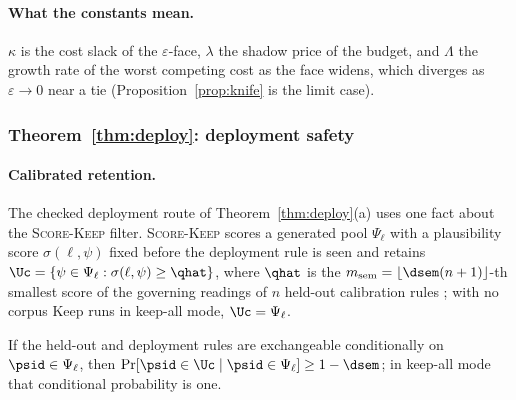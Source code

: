 \paragraph{What the constants mean.} $\kappa$ is the cost slack of the $\varepsilon$-face, $\lambda$
the shadow price of the budget, and $\Lambda$ the growth rate of the worst competing cost as the
face widens, which diverges as $\varepsilon\to0$ near a tie (Proposition~\ref{prop:knife} is the
limit case).

\subsubsection*{Theorem~\ref{thm:deploy}: deployment safety}
\label{app:proof-coverage}\label{app:proof-deploy}

\paragraph{Calibrated retention.} The checked deployment route of Theorem~\ref{thm:deploy}(a) uses one fact about the
\textsc{Score-Keep} filter. \textsc{Score-Keep} scores
a generated pool $\Psi_\ell$ with a plausibility score $\sigma(\ell,\psi)$ fixed before
the deployment rule is seen and retains
$\Uc=\{\psi\in\Psi_\ell: \sigma(\ell,\psi)\ge\qhat\}$, where $\qhat$ is the
$m_{\mathrm{sem}}=\lfloor\dsem(n+1)\rfloor$-th smallest score of the governing readings of $n$
held-out calibration rules \citep{vovk2005conformal,angelopoulos2023conformal};
with no corpus Keep runs in keep-all mode, $\Uc=\Psi_\ell$.

\begin{lemma}
\label{lem:coverage}
If the held-out and deployment rules are exchangeable conditionally on
$\psid\in\Psi_\ell$, then $\Pr[\psid\in\Uc\mid\psid\in\Psi_\ell]\ge1-\dsem$; in
keep-all mode that conditional probability is one.
\end{lemma}


